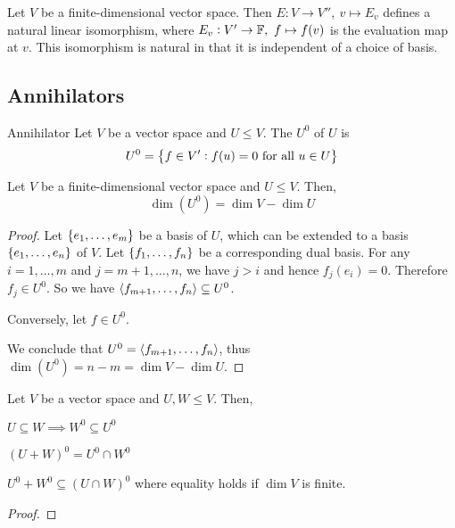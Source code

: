\documentclass{styles/tufte}
\begin{document}
\begin{proposition}{}{}
  Let $V$ be a finite-dimensional vector space. Then $E: V \to V'',\ v \mapsto E_v$ defines a natural linear isomorphism, where $E_v: V' \to \mathbb{F},\ f \mapsto f(v)$ is the evaluation map at $v$. This isomorphism is natural in that it is independent of a choice of basis.
\end{proposition}


\subsection{Annihilators}
  
  \begin{definition}{Annihilator}{}
    Let $V$ be a vector space and $U \leqslant V$. The  $U^0$ of $U$ is
    \[ U^0 = \set{f \in V': f(u) = 0 \text{ for all $u \in U$}} \]
  \end{definition}
  
  \begin{proposition}{}{}
    Let $V$ be a finite-dimensional vector space and $U \leqslant V$. Then,
    \[ \dim(U^0) = \dim V - \dim U \]
  \end{proposition}
  \begin{proof}
    Let $\set{e_1, \dots, e_m}$ be a basis of $U$, which can be extended to a basis $\set{e_1, \dots, e_n}$ of $V$. Let $\set{f_1, \dots, f_n}$ be a corresponding dual basis. For any $i = 1, \dots, m$ and $j = m + 1, \dots, n$, we have $j > i$ and hence $f_j(e_i) = 0$. Therefore $f_j \in U^0$. So we have $\langle f_{m+1}, \dots, f_n \rangle \subseteq U^0$.
    
    Conversely, let $f \in U^0$.
    
    We conclude that $U^0 = \langle f_{m+1}, \dots, f_n \rangle$, thus $\dim(U^0) = n - m = \dim V - \dim U$.
  \end{proof}
  
  \begin{proposition}{}{}
    Let $V$ be a vector space and $U, W \leqslant V$. Then,
    \begin{romanenum}
      \item $U \subseteq W \implies W^0 \subseteq U^0$
      \item $(U + W)^0 = U^0 \cap W^0$
      \item $U^0 + W^0 \subseteq (U \cap W)^0$ where equality holds if $\dim V$ is finite.
    \end{romanenum}
  \end{proposition}
  \begin{proof}
    
  \end{proof}
  
\end{document}
